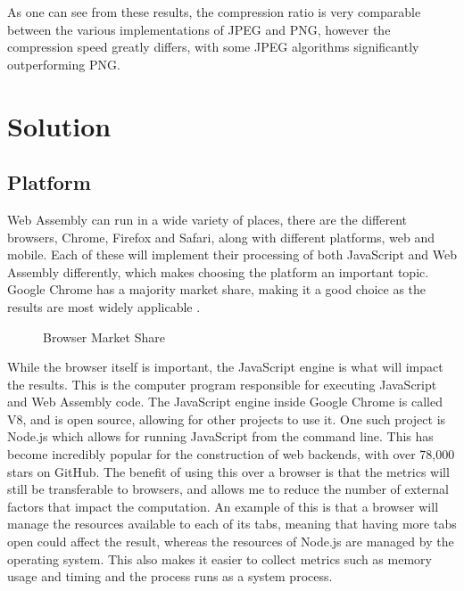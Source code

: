 \documentclass[12pt,a4paper]{article}
\begin{document}
As one can see from these results, the compression ratio is very comparable between the various implementations of JPEG and PNG, however the compression speed greatly differs, with some JPEG algorithms significantly outperforming PNG.


\section{Solution}

\subsection{Platform}

Web Assembly can run in a wide variety of places, there are the different browsers, Chrome, Firefox and Safari, along with different platforms, web and mobile. Each of these will implement their processing of both JavaScript and Web Assembly differently, which makes choosing the platform an important topic. Google Chrome has a majority market share, making it a good choice as the results are most widely applicable \cite{webmarketshare}.
\begin{figure}[H]
    \centering
    \caption{Browser Market Share}

\end{figure}
While the browser itself is important, the JavaScript engine is what will impact the results. This is the computer program responsible for executing JavaScript and Web Assembly code. The JavaScript engine inside Google Chrome is called V8, and is open source, allowing for other projects to use it. One such project is Node.js which allows for running JavaScript from the command line. This has become incredibly popular for the construction of web backends, with over 78,000 stars on GitHub. The benefit of using this over a browser is that the metrics will still be transferable to browsers, and allows me to reduce the number of external factors that impact the computation. An example of this is that a browser will manage the resources available to each of its tabs, meaning that having more tabs open could affect the result, whereas the resources of Node.js are managed by the operating system. This also makes it easier to collect metrics such as memory usage and timing and the process runs as a system process.
\end{document}
